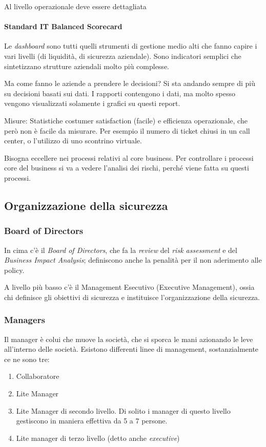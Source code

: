 
Al livello operazionale deve essere dettagliata

\paragraph*{Standard IT Balanced Scorecard} 
Le \textit{dashboard} sono tutti quelli strumenti di gestione medio alti che 
fanno capire i vari livelli (di liquidità, di sicurezza aziendale). Sono 
indicatori semplici che sintetizzano strutture aziendali molto più complesse.

Ma come fanno le aziende a prendere le decisioni? Si sta andando sempre di più 
su decisioni basati sui dati. I rapporti contengono i dati, ma molto spesso 
vengono visualizzati solamente i grafici su questi report.

Misure: Statistiche costumer satisfaction (facile) e efficienza operazionale, 
che però non è facile da misurare. Per esempio il numero di ticket chiusi in un 
call center, o l'utilizzo di uno scontrino virtuale.


Bisogna eccellere nei processi relativi al core business. Per controllare i 
processi core del business si va a vedere l'analisi dei rischi, perché viene 
fatta su questi processi.

\subsection{Organizzazione della sicurezza}

\subsubsection{Board of Directors}
In cima c'è il \textit{Board of Directors}, che fa la \textit{review} del 
\textit{risk assessment} e del \textit{Business Impact Analysis}; definiscono 
anche la penalità per il non aderimento alle policy.

A livello più basso c'è il Management Esecutivo (Executive Management), ossia 
chi definisce gli obiettivi di sicurezza e instituisce l'organizzazione della 
sicurezza.

\subsubsection{Managers}
Il manager è colui che muove la società, che si sporca le mani azionando le leve 
all'interno delle società.
Esistono differenti linee di management, sostanzialmente ce ne sono tre:
\begin{enumerate}
\item Collaboratore
\item Lite Manager
\item Lite Manager di secondo livello. Di solito i manager di questo livello 
gestiscono in maniera effettiva da 5 a 7 persone.
\item Lite manager di terzo livello (detto anche \textit{executive})
\end{enumerate}

